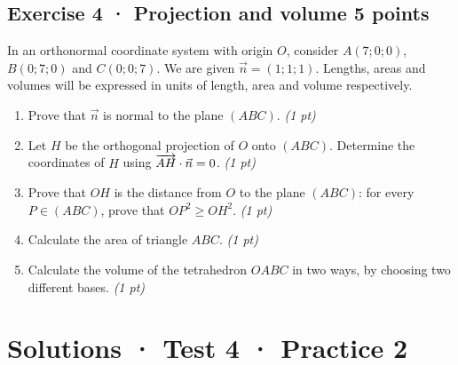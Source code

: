 \subsection*{Exercise 4 · Projection and volume \hfill 5 points}In an orthonormal coordinate system with origin $O$, consider $A(7;0;0)$, $B(0;7;0)$ and $C(0;0;7)$. We are given $\vec n=(1;1;1)$. Lengths, areas and volumes will be expressed in units of length, area and volume respectively.

\begin{enumerate}

\item Prove that $\vec n$ is normal to the plane $(ABC)$. \hfill\textit{(1 pt)}

\item Let $H$ be the orthogonal projection of $O$ onto $(ABC)$. Determine the coordinates of $H$ using $\overrightarrow{AH}\cdot\vec n=0$. \hfill\textit{(1 pt)}

\item Prove that $OH$ is the distance from $O$ to the plane $(ABC)$: for every $P\in(ABC)$, prove that $OP^2\ge OH^2$. \hfill\textit{(1 pt)}

\item Calculate the area of triangle $ABC$. \hfill\textit{(1 pt)}

\item Calculate the volume of the tetrahedron $OABC$ in two ways, by choosing two different bases. \hfill\textit{(1 pt)}

\end{enumerate}

\ifprof\clearpage

\section*{Solutions · Test 4 · Practice 2}\label{cor:6-2}

